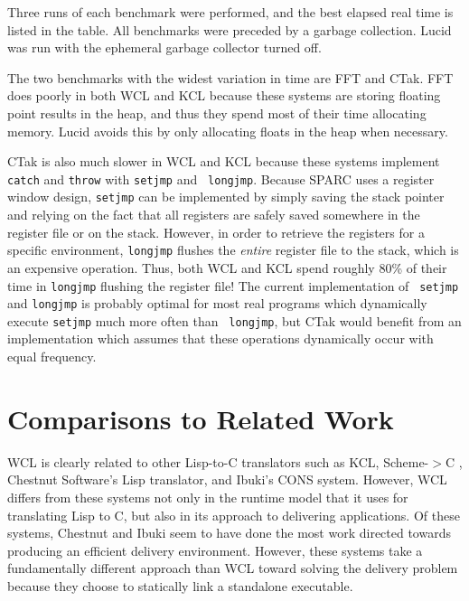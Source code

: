 Three runs of each benchmark were performed, and the best elapsed
real time is listed in the table. All benchmarks were preceded by a
garbage collection.  Lucid was run with the ephemeral garbage
collector turned off. 

The two benchmarks with the widest variation in time are FFT and CTak.
FFT does poorly in both WCL and KCL because these systems are storing
floating point results in the heap, and thus they spend most of their time
allocating memory. Lucid avoids this by only allocating floats
in the heap when necessary.

CTak is also much slower in WCL and KCL because these systems
implement {\tt catch} and {\tt throw} with {\tt setjmp} and {\tt
longjmp}.  Because SPARC uses a register window design, {\tt setjmp}
can be implemented by simply saving the stack pointer and relying on
the fact that all registers are safely saved somewhere in the register
file or on the stack.  However, in order to retrieve the registers for
a specific environment, {\tt longjmp} flushes the {\it entire}
register file to the stack, which is an expensive operation.  Thus,
both WCL and KCL spend roughly 80\% of their time in {\tt longjmp}
flushing the register file!  The current implementation of {\tt
setjmp} and {\tt longjmp} is probably optimal for most real programs
which dynamically execute {\tt setjmp} much more often than {\tt
longjmp}, but CTak would benefit from an implementation which assumes
that these operations dynamically occur with equal frequency.

\section{Comparisons to Related Work}

WCL is clearly related to other Lisp-to-C translators such as KCL,
Scheme-$>$C \cite{s2c}, Chestnut Software's Lisp translator, and
Ibuki's CONS system. However, WCL differs from these systems not only
in the runtime model that it uses for translating Lisp to C, but also
in its approach to delivering applications.  Of these systems,
Chestnut and Ibuki seem to have done the most work directed towards
producing an efficient delivery environment.  However, these systems
take a fundamentally different approach than WCL toward solving the
delivery problem because they choose to statically link a standalone
executable.

